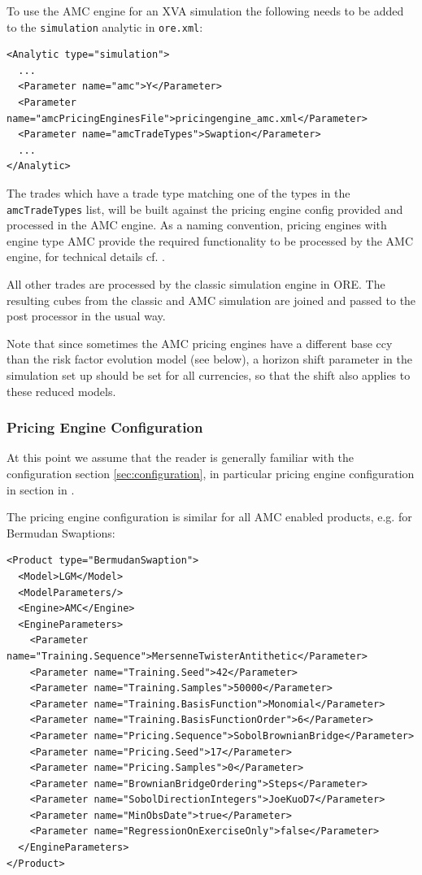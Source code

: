 To use the AMC engine for an XVA simulation the following needs to be added to the {\tt simulation} analytic
in {\tt ore.xml}:

\begin{verbatim}
<Analytic type="simulation">
  ...
  <Parameter name="amc">Y</Parameter>
  <Parameter name="amcPricingEnginesFile">pricingengine_amc.xml</Parameter>
  <Parameter name="amcTradeTypes">Swaption</Parameter>
  ...
</Analytic>
\end{verbatim}

The trades which have a trade type matching one of the types in the \verb+amcTradeTypes+ list, will be built against the
pricing engine config provided and processed in the AMC engine. As a naming convention, pricing engines with engine type
AMC provide the required functionality to be processed by the AMC engine, for technical details cf. \cite{methods}.

All other trades are processed by the classic simulation engine in ORE. The resulting cubes from the classic and AMC
simulation are joined and passed to the post processor in the usual way.

Note that since sometimes the AMC pricing engines have a different base ccy than the risk factor evolution model (see
below), a horizon shift parameter in the simulation set up should be set for all currencies, so that the shift also
applies to these reduced models.

\subsubsection*{Pricing Engine Configuration}
\label{sec:amc_pricingengineconfig}

At this point we assume that the reader is generally familiar with the configuration section
\ref{sec:configuration}, in particular pricing engine configuration in section in \cite{products}.

The pricing engine configuration is similar for all AMC enabled products, e.g. for Bermudan Swaptions:

\begin{verbatim}
<Product type="BermudanSwaption">
  <Model>LGM</Model>
  <ModelParameters/>
  <Engine>AMC</Engine>
  <EngineParameters>
    <Parameter name="Training.Sequence">MersenneTwisterAntithetic</Parameter>
    <Parameter name="Training.Seed">42</Parameter>
    <Parameter name="Training.Samples">50000</Parameter>
    <Parameter name="Training.BasisFunction">Monomial</Parameter>
    <Parameter name="Training.BasisFunctionOrder">6</Parameter>
    <Parameter name="Pricing.Sequence">SobolBrownianBridge</Parameter>
    <Parameter name="Pricing.Seed">17</Parameter>
    <Parameter name="Pricing.Samples">0</Parameter>
    <Parameter name="BrownianBridgeOrdering">Steps</Parameter>
    <Parameter name="SobolDirectionIntegers">JoeKuoD7</Parameter>
    <Parameter name="MinObsDate">true</Parameter>
    <Parameter name="RegressionOnExerciseOnly">false</Parameter>
  </EngineParameters>
</Product>
\end{verbatim}

